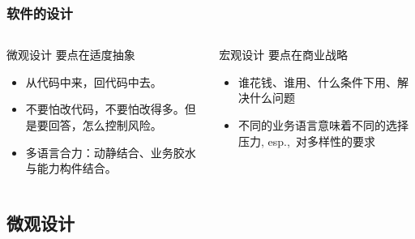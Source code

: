 \documentclass[UTF8,lualatex]{ctexbeamer}
\begin{document}
\begin{frame}
    \frametitle{软件的设计}
    \begin{columns}[t]
        \begin{column}{0.45\textwidth}
            \begin{block}{微观设计}
                要点在适度抽象
                \begin{itemize}
                    \item 从代码中来，回代码中去。
                    \item 不要怕改代码，不要怕改得多。但是要回答，怎么控制风险。
                    \item 多语言合力：动静结合、业务胶水与能力构件结合。
                \end{itemize}
            \end{block}
        \end{column}
        \begin{column}{0.45\textwidth}
            \begin{block}{宏观设计}
                要点在商业战略
                \begin{itemize}
                    \item 谁花钱、谁用、什么条件下用、解决什么问题
                    \item 不同的业务语言意味着不同的选择压力, esp.,\ 对多样性的要求
                \end{itemize}
            \end{block}
        \end{column}
    \end{columns}
\end{frame}

\subsection{微观设计}
\end{document}
